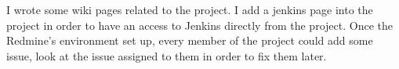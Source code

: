  


I wrote some wiki pages related to the project. I add a jenkins page into the project
 in order to have an access to Jenkins directly from the project.  
 Once the Redmine's environment set up, every member of the project could add some
 issue, look at the issue assigned to them in order to fix them later. 


